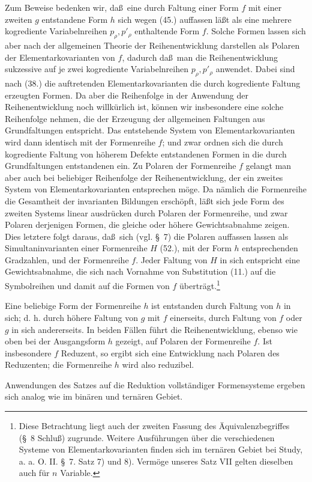 \documentclass[11pt]{article}
\begin{document}
Zum Beweise bedenken wir, da\ss\ eine durch Faltung einer Form $f$ mit einer zweiten $g$ entstandene Form $h$ sich wegen (45.) auffassen l\"a\ss t als eine mehrere kogrediente Variabelnreihen $p_\rho,p'_\rho$ enthaltende Form $f$. Solche Formen lassen sich aber nach der allgemeinen Theorie der Reihenentwicklung darstellen als Polaren der Elementarkovarianten von $f$, dadurch da\ss\ man die Reihenentwicklung sukzessive auf je zwei kogrediente Variabelnreihen $p_\rho,p'_\rho$ anwendet. Dabei sind nach (38.) die auftretenden Elementarkovarianten die durch kogrediente Faltung erzeugten Formen. Da aber die Reihenfolge in der Anwendung der Reihenentwicklung noch willk\"urlich ist, k\"onnen wir insbesondere eine solche Reihenfolge nehmen, die der Erzeugung der allgemeinen Faltungen aus Grundfaltungen entspricht. Das entstehende System von Elementarkovarianten wird dann identisch mit der Formenreihe $f$; und zwar ordnen sich die durch kogrediente Faltung von h\"oherem Defekte entstandenen Formen in die durch Grundfaltungen entstandenen ein. Zu Polaren der Formenreihe $f$ gelangt man aber auch bei beliebiger Reihenfolge der Reihenentwicklung, der ein zweites System von Elementarkovarianten entsprechen m\"oge. Da n\"amlich die Formenreihe die Gesamtheit der invarianten Bildungen ersch\"opft, l\"a\ss t sich jede Form des zweiten Systems linear ausdr\"ucken durch Polaren der Formenreihe, und zwar Polaren derjenigen Formen, die gleiche oder h\"ohere Gewichtsabnahme zeigen. Dies letztere folgt daraus, da\ss\ sich (vgl. \S\ 7) die Polaren auffassen lassen als Simultaninvarianten einer Formenreihe $H$ (52.), mit der Form $h$ entsprechenden Gradzahlen, und der Formenreihe $f$. Jeder Faltung von $H$ in sich entspricht eine Gewichtsabnahme, die sich nach Vornahme von Substitution (11.) auf die Symbolreihen und damit auf die Formen von $f$ \"ubertr\"agt.\footnote{Diese Betrachtung liegt auch der zweiten Fassung des \"Aquivalenzbegriffes (\S\ 8 Schlu\ss) zugrunde. Weitere Ausf\"uhrungen \"uber die verschiedenen Systeme von Elementarkovarianten finden sich im tern\"aren Gebiet bei Study, a. a. O. II. \S\ 7. Satz 7) und 8). Verm\"oge unseres Satz VII gelten dieselben auch f\"ur $n$ Variable.}

Eine beliebige Form der Formenreihe $h$ ist entstanden durch Faltung von $h$ in sich; d. h. durch h\"ohere Faltung von $g$ mit $f$ einerseits, durch Faltung von $f$ oder $g$ in sich andererseits. In beiden F\"allen f\"uhrt die Reihenentwicklung, ebenso wie oben bei der Ausgangsform $h$ gezeigt, auf Polaren der Formenreihe $f$. Ist insbesondere $f$ Reduzent, so ergibt sich eine Entwicklung nach Polaren des Reduzenten; die Formenreihe $h$ wird also reduzibel.

Anwendungen des Satzes auf die Reduktion vollst\"andiger Formensysteme ergeben sich analog wie im bin\"aren und tern\"aren Gebiet.
\end{document}
